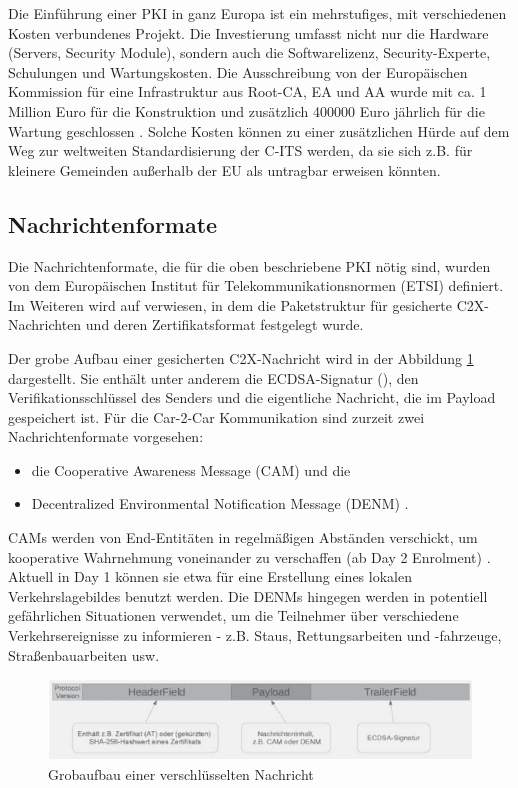 Die Einführung einer PKI in ganz Europa ist ein mehrstufiges, mit verschiedenen Kosten verbundenes Projekt. Die Investierung umfasst nicht nur die Hardware (Servers, Security Module), sondern auch die Softwarelizenz, Security-Experte, Schulungen und Wartungskosten. Die Ausschreibung von der Europäischen Kommission für eine Infrastruktur aus Root-CA, EA und AA wurde mit ca. 1 Million Euro für die Konstruktion und zusätzlich 400000 Euro jährlich für die Wartung geschlossen \cite{Tender}. Solche Kosten können zu einer zusätzlichen Hürde auf dem Weg zur weltweiten Standardisierung der C-ITS werden, da sie sich z.B. für kleinere Gemeinden außerhalb der EU als untragbar erweisen könnten.

\subsection{Nachrichtenformate}
\label{sec:FirstContentSection:SecondSubSection}

Die Nachrichtenformate, die für die oben beschriebene PKI nötig sind, wurden von dem Europäischen Institut für Telekommunikationsnormen (ETSI) definiert. Im Weiteren wird auf \cite{ETSI2018} verwiesen, in dem die Paketstruktur für gesicherte C2X-Nachrichten und deren Zertifikatsformat festgelegt wurde. 

Der grobe Aufbau einer gesicherten C2X-Nachricht wird in der Abbildung \ref{fig:nachrichtenaufbau} dargestellt. Sie enthält unter anderem die ECDSA-Signatur (\cite{Barker2013}), den Verifikationsschlüssel des Senders und die eigentliche Nachricht, die im Payload gespeichert ist. Für die Car-2-Car Kommunikation sind zurzeit zwei Nachrichtenformate vorgesehen:
\begin{itemize}
	\item die Cooperative Awareness Message (CAM) und die 
	\item Decentralized Environmental Notification Message (DENM) \cite{ETSI2013}.
\end{itemize}
CAMs werden von End-Entitäten in regelmäßigen Abständen verschickt, um kooperative Wahrnehmung voneinander zu verschaffen (ab Day 2 Enrolment) . Aktuell in Day 1 können sie etwa für eine Erstellung eines lokalen Verkehrslagebildes benutzt werden. Die DENMs hingegen werden in potentiell gefährlichen Situationen verwendet, um die Teilnehmer über verschiedene Verkehrsereignisse zu informieren - z.B. Staus, Rettungsarbeiten und -fahrzeuge, Straßenbauarbeiten usw. 

\begin{figure}
	\centering
	\includegraphics[width=0.7\linewidth]{images/Nachrichtenaufbau}
	\caption[Grobaufbau einer verschlüsselten Nachricht]{Grobaufbau einer verschlüsselten Nachricht \footnotemark}
	\label{fig:nachrichtenaufbau}
\end{figure}

